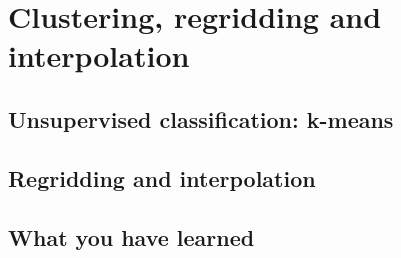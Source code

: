 \chapter{Clustering, regridding and interpolation}\label{ch:methods}
\section{Unsupervised classification: k-means}

\section{Regridding and interpolation}

\section{What you have learned}

